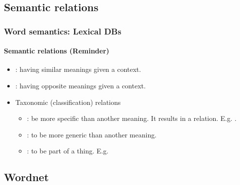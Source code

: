 \documentclass[xcolor=table]{beamer}
\begin{document}
\subsection{Semantic relations}

\begin{frame}
	\frametitle{Word semantics: Lexical DBs}
	\framesubtitle{Semantic relations (Reminder)}

	\begin{itemize}
		\item {}: having similar meanings given a context.
		\item {}: having opposite meanings given a context.
		\item Taxonomic (classification) relations
		\begin{itemize}
			\item {}: be more specific than another meaning. It results in a  relation. E.g. .
			\item {}: to be more generic than another meaning.
			\item {}: to be part of a thing. E.g. 
		\end{itemize}
	\end{itemize}
	
\end{frame}

\subsection{Wordnet}
\end{document}
